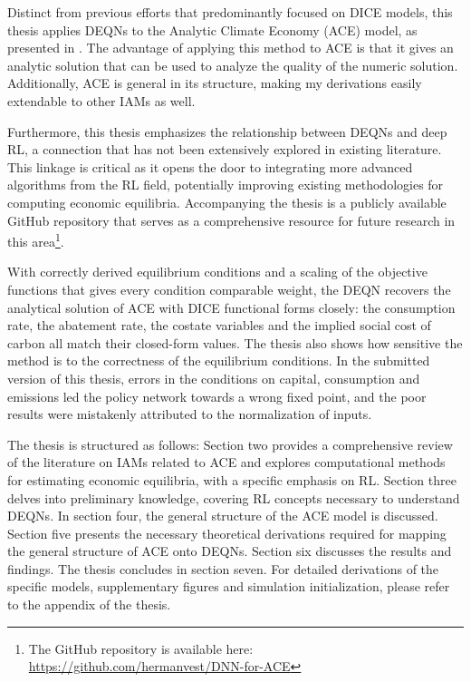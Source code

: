 Distinct from previous efforts that predominantly focused on DICE models, this thesis applies DEQNs to the Analytic Climate Economy (ACE) model, as presented in \textcite{TraegerChristian2023ACE}. The advantage of applying this method to ACE is that it gives an analytic solution that can be used to analyze the quality of the numeric solution. Additionally, ACE is general in its structure, making my derivations easily extendable to other IAMs as well. 

Furthermore, this thesis emphasizes the relationship between DEQNs and deep RL, a connection that has not been extensively explored in existing literature. This linkage is critical as it opens the door to integrating more advanced algorithms from the RL field, potentially improving existing methodologies for computing economic equilibria. Accompanying the thesis is a publicly available GitHub repository that serves as a comprehensive resource for future research in this area\footnote{The GitHub repository is available here: \url{https://github.com/hermanvest/DNN-for-ACE}}.

With correctly derived equilibrium conditions and a scaling of the objective functions that gives every condition comparable weight, the DEQN recovers the analytical solution of ACE with DICE functional forms closely: the consumption rate, the abatement rate, the costate variables and the implied social cost of carbon all match their closed-form values. The thesis also shows how sensitive the method is to the correctness of the equilibrium conditions. In the submitted version of this thesis, errors in the conditions on capital, consumption and emissions led the policy network towards a wrong fixed point, and the poor results were mistakenly attributed to the normalization of inputs.

The thesis is structured as follows: Section two provides a comprehensive review of the literature on IAMs related to ACE and explores computational methods for estimating economic equilibria, with a specific emphasis on RL. Section three delves into preliminary knowledge, covering RL concepts necessary to understand DEQNs. In section four, the general structure of the ACE model is discussed. Section five presents the necessary theoretical derivations required for mapping the general structure of ACE onto DEQNs. Section six discusses the results and findings. The thesis concludes in section seven. For detailed derivations of the specific models, supplementary figures and simulation initialization, please refer to the appendix of the thesis.